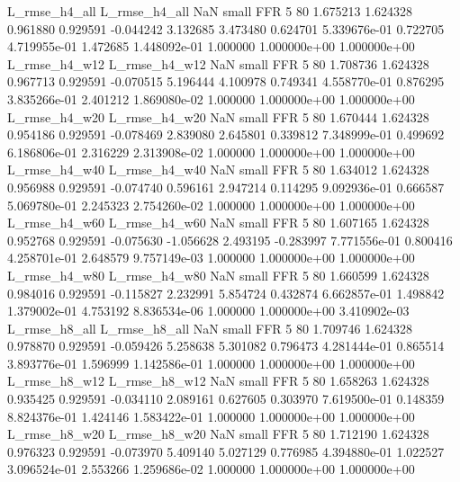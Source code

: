  L_rmse_h4_all  L_rmse_h4_all                   NaN      small      FFR                 5 80 1.675213       1.624328 0.961880       0.929591   -0.044242      3.132685      3.473480     0.624701   5.339676e-01  0.722705 4.719955e-01     1.472685   1.448092e-01            1.000000    1.000000e+00        1.000000e+00
 L_rmse_h4_w12  L_rmse_h4_w12                   NaN      small      FFR                 5 80 1.708736       1.624328 0.967713       0.929591   -0.070515      5.196444      4.100978     0.749341   4.558770e-01  0.876295 3.835266e-01     2.401212   1.869080e-02            1.000000    1.000000e+00        1.000000e+00
 L_rmse_h4_w20  L_rmse_h4_w20                   NaN      small      FFR                 5 80 1.670444       1.624328 0.954186       0.929591   -0.078469      2.839080      2.645801     0.339812   7.348999e-01  0.499692 6.186806e-01     2.316229   2.313908e-02            1.000000    1.000000e+00        1.000000e+00
 L_rmse_h4_w40  L_rmse_h4_w40                   NaN      small      FFR                 5 80 1.634012       1.624328 0.956988       0.929591   -0.074740      0.596161      2.947214     0.114295   9.092936e-01  0.666587 5.069780e-01     2.245323   2.754260e-02            1.000000    1.000000e+00        1.000000e+00
 L_rmse_h4_w60  L_rmse_h4_w60                   NaN      small      FFR                 5 80 1.607165       1.624328 0.952768       0.929591   -0.075630     -1.056628      2.493195    -0.283997   7.771556e-01  0.800416 4.258701e-01     2.648579   9.757149e-03            1.000000    1.000000e+00        1.000000e+00
 L_rmse_h4_w80  L_rmse_h4_w80                   NaN      small      FFR                 5 80 1.660599       1.624328 0.984016       0.929591   -0.115827      2.232991      5.854724     0.432874   6.662857e-01  1.498842 1.379002e-01     4.753192   8.836534e-06            1.000000    1.000000e+00        3.410902e-03
 L_rmse_h8_all  L_rmse_h8_all                   NaN      small      FFR                 5 80 1.709746       1.624328 0.978870       0.929591   -0.059426      5.258638      5.301082     0.796473   4.281444e-01  0.865514 3.893776e-01     1.596999   1.142586e-01            1.000000    1.000000e+00        1.000000e+00
 L_rmse_h8_w12  L_rmse_h8_w12                   NaN      small      FFR                 5 80 1.658263       1.624328 0.935425       0.929591   -0.034110      2.089161      0.627605     0.303970   7.619500e-01  0.148359 8.824376e-01     1.424146   1.583422e-01            1.000000    1.000000e+00        1.000000e+00
 L_rmse_h8_w20  L_rmse_h8_w20                   NaN      small      FFR                 5 80 1.712190       1.624328 0.976323       0.929591   -0.073970      5.409140      5.027129     0.776985   4.394880e-01  1.022527 3.096524e-01     2.553266   1.259686e-02            1.000000    1.000000e+00        1.000000e+00
